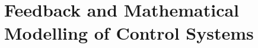 \documentclass[../course]{subfiles}
\begin{document}
\chapter{Feedback and Mathematical Modelling of Control Systems} \label{chp:ch01FeebackMathModelling}


\end{document}
